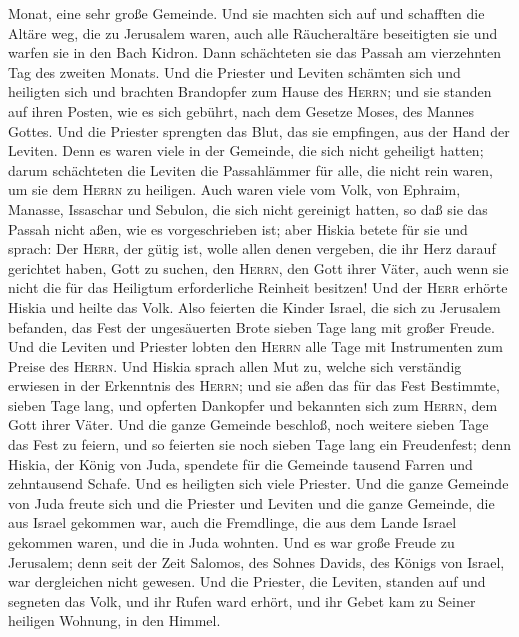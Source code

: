 Monat, eine sehr große Gemeinde.  Und sie machten sich
auf und schafften die Altäre weg, die zu Jerusalem waren, auch alle
Räucheraltäre beseitigten sie und warfen sie in den Bach Kidron.
 Dann schächteten sie das Passah am vierzehnten Tag des
zweiten Monats. Und die Priester und Leviten schämten sich und heiligten
sich und brachten Brandopfer zum Hause des \textsc{Herrn};
 und sie standen auf ihren Posten, wie es sich gebührt,
nach dem Gesetze Moses, des Mannes Gottes. Und die Priester sprengten
das Blut, das sie empfingen, aus der Hand der Leviten. 
Denn es waren viele in der Gemeinde, die sich nicht geheiligt hatten;
darum schächteten die Leviten die Passahlämmer für alle, die nicht rein
waren, um sie dem \textsc{Herrn} zu heiligen.  Auch waren
viele vom Volk, von Ephraim, Manasse, Issaschar und Sebulon, die sich
nicht gereinigt hatten, so daß sie das Passah nicht aßen, wie es
vorgeschrieben ist;  aber Hiskia betete für sie und
sprach: Der \textsc{Herr}, der gütig ist, wolle allen denen vergeben,
die ihr Herz darauf gerichtet haben, Gott zu suchen, den \textsc{Herrn},
den Gott ihrer Väter, auch wenn sie nicht die für das Heiligtum
erforderliche Reinheit besitzen!  Und der \textsc{Herr}
erhörte Hiskia und heilte das Volk.  Also feierten die
Kinder Israel, die sich zu Jerusalem befanden, das Fest der ungesäuerten
Brote sieben Tage lang mit großer Freude. Und die Leviten und Priester
lobten den \textsc{Herrn} alle Tage mit Instrumenten zum Preise des
\textsc{Herrn}.  Und Hiskia sprach allen Mut zu, welche
sich verständig erwiesen in der Erkenntnis des \textsc{Herrn}; und sie
aßen das für das Fest Bestimmte, sieben Tage lang, und opferten
Dankopfer und bekannten sich zum \textsc{Herrn}, dem Gott ihrer Väter.
 Und die ganze Gemeinde beschloß, noch weitere sieben
Tage das Fest zu feiern, und so feierten sie noch sieben Tage lang ein
Freudenfest;  denn Hiskia, der König von Juda, spendete
für die Gemeinde tausend Farren und zehntausend Schafe. Und es heiligten
sich viele Priester.  Und die ganze Gemeinde von Juda
freute sich und die Priester und Leviten und die ganze Gemeinde, die aus
Israel gekommen war, auch die Fremdlinge, die aus dem Lande Israel
gekommen waren, und die in Juda wohnten.  Und es war
große Freude zu Jerusalem; denn seit der Zeit Salomos, des Sohnes
Davids, des Königs von Israel, war dergleichen nicht gewesen.
 Und die Priester, die Leviten, standen auf und segneten
das Volk, und ihr Rufen ward erhört, und ihr Gebet kam zu Seiner
heiligen Wohnung, in den Himmel.

